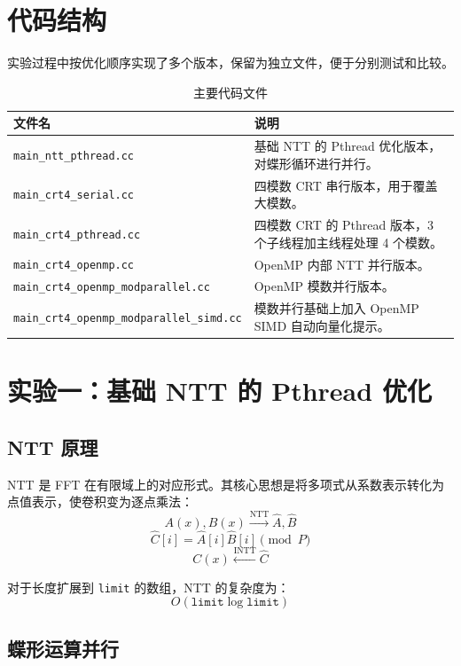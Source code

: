 \documentclass[a4paper]{article}
\begin{document}
\section{代码结构}

实验过程中按优化顺序实现了多个版本，保留为独立文件，便于分别测试和比较。

\begin{table}[htbp]
  \centering
  \caption{主要代码文件}
  \label{tab:code_files}
  \begin{tabular}{l p{9cm}}
    \toprule
    文件名 & 说明 \\
    \midrule
    \texttt{main\_ntt\_pthread.cc} & 基础 NTT 的 Pthread 优化版本，对蝶形循环进行并行。 \\
    \texttt{main\_crt4\_serial.cc} & 四模数 CRT 串行版本，用于覆盖大模数。 \\
    \texttt{main\_crt4\_pthread.cc} & 四模数 CRT 的 Pthread 版本，3 个子线程加主线程处理 4 个模数。 \\
    \texttt{main\_crt4\_openmp.cc} & OpenMP 内部 NTT 并行版本。 \\
    \texttt{main\_crt4\_openmp\_modparallel.cc} & OpenMP 模数并行版本。 \\
    \texttt{main\_crt4\_openmp\_modparallel\_simd.cc} & 模数并行基础上加入 OpenMP SIMD 自动向量化提示。 \\
    \bottomrule
  \end{tabular}
\end{table}

\section{实验一：基础 NTT 的 Pthread 优化}

\subsection{NTT 原理}

NTT 是 FFT 在有限域上的对应形式。其核心思想是将多项式从系数表示转化为点值表示，使卷积变为逐点乘法：
\[
A(x),B(x)\xrightarrow{\mathrm{NTT}}\hat{A},\hat{B}
\]
\[
\hat{C}[i]=\hat{A}[i]\hat{B}[i]\pmod P
\]
\[
C(x)\xleftarrow{\mathrm{INTT}}\hat{C}
\]

对于长度扩展到 \texttt{limit} 的数组，NTT 的复杂度为：
\[
O(\texttt{limit}\log \texttt{limit})
\]

\subsection{蝶形运算并行}
\end{document}
